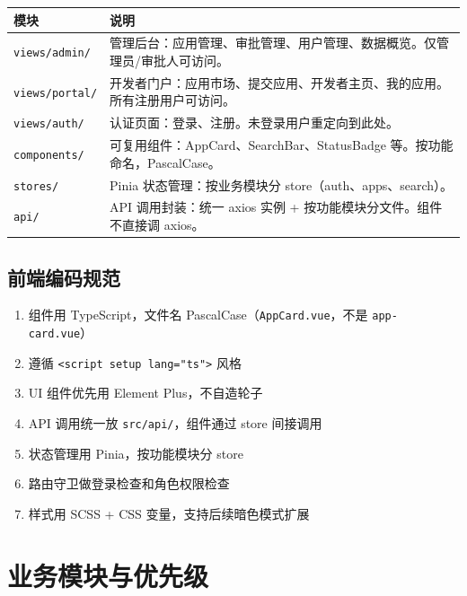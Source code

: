 \documentclass[11pt,a4paper]{article}
\begin{document}
\begin{table}[h]
\centering
\begin{tabularx}{\linewidth}{lX}
\toprule
\textbf{模块} & \textbf{说明} \\
\midrule
\texttt{views/admin/} & 管理后台：应用管理、审批管理、用户管理、数据概览。仅管理员/审批人可访问。 \\
\texttt{views/portal/} & 开发者门户：应用市场、提交应用、开发者主页、我的应用。所有注册用户可访问。 \\
\texttt{views/auth/} & 认证页面：登录、注册。未登录用户重定向到此处。 \\
\texttt{components/} & 可复用组件：AppCard、SearchBar、StatusBadge 等。按功能命名，PascalCase。 \\
\texttt{stores/} & Pinia 状态管理：按业务模块分 store（auth、apps、search）。 \\
\texttt{api/} & API 调用封装：统一 axios 实例 + 按功能模块分文件。组件不直接调 axios。 \\
\bottomrule
\end{tabularx}
\end{table}

\subsection{前端编码规范}

\begin{enumerate}[nosep]
  \item 组件用 TypeScript，文件名 PascalCase（\texttt{AppCard.vue}，不是 \texttt{app-card.vue}）
  \item 遵循 \texttt{<script setup lang="ts">} 风格
  \item UI 组件优先用 Element Plus，不自造轮子
  \item API 调用统一放 \texttt{src/api/}，组件通过 store 间接调用
  \item 状态管理用 Pinia，按功能模块分 store
  \item 路由守卫做登录检查和角色权限检查
  \item 样式用 SCSS + CSS 变量，支持后续暗色模式扩展
\end{enumerate}

\section{业务模块与优先级}
\end{document}
